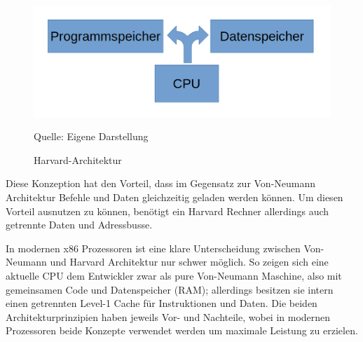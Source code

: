 \documentclass[12pt]{article}
\begin{document}
\begin{figure}[!htb]
\centering
\includegraphics[scale=0.30]{harvard}
\caption{Harvard-Architektur}
\centering
\small Quelle: Eigene Darstellung
\label{fig:flipflop}
\end{figure}


\noindent Diese Konzeption hat den Vorteil, dass im Gegensatz zur Von-Neumann Architektur Befehle und Daten gleichzeitig geladen werden können. Um diesen Vorteil ausnutzen zu können, benötigt ein Harvard Rechner allerdings auch getrennte Daten und Adressbusse. 
\par\bigskip
\noindent In modernen x86 Prozessoren ist eine klare Unterscheidung zwischen Von-Neumann und Harvard Architektur nur schwer möglich. So zeigen sich eine aktuelle CPU dem Entwickler zwar als pure Von-Neumann Maschine, also mit gemeinsamen Code und Datenspeicher (RAM); allerdings besitzen sie intern einen getrennten Level-1 Cache für Instruktionen und Daten. Die beiden Architekturprinzipien haben jeweils Vor- und Nachteile, wobei in modernen Prozessoren beide Konzepte verwendet werden um maximale Leistung zu erzielen.
\end{document}
